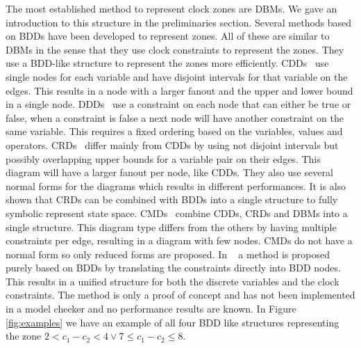 The most established method to represent clock zones are DBMs. We gave an introduction to this structure in the preliminaries section. Several methods based on BDDs have been developed to represent zones. All of these are similar to DBMs in the sense that they use clock constraints to represent the zones. They use a BDD-like structure to represent the zones more efficiently. CDDs~\cite{BRICS19491} use single nodes for each variable and have disjoint intervals for that variable on the edges. This results in a node with a larger fanout and the upper and lower bound in a single node. DDDs~\cite{ddds, ddd-datastructure-99} use a constraint on each node that can either be true or false, when a constraint is false a next node will have another constraint on the same variable. This requires a fixed ordering based on the variables, values and operators. CRDs~\cite{crds} differ mainly from CDDs by using not disjoint intervals but possibly overlapping upper bounds for a variable pair on their edges. This diagram will have a larger fanout per node, like CDDs. They also use several normal forms for the diagrams which results in different performances. It is also shown that CRDs can be combined with BDDs into a single structure to fully symbolic represent state space. CMDs~\cite{5702245} combine CDDs, CRDs and DBMs into a single structure. This diagram type differs from the others by having multiple constraints per edge, resulting in a diagram with few nodes. CMDs do not have a normal form so only reduced forms are proposed. In ~\cite{7098276, 7184781} a method is proposed purely based on BDDs by translating the constraints directly into BDD nodes. This results in a unified structure for both the discrete variables and the clock constraints. The method is only a proof of concept and has not been implemented in a model checker and no performance results are known. In Figure \ref{fig:examples} we have an example of all four BDD like structures representing the zone $2 < c_1 - c_2 < 4 \vee 7 \leq c_1 - c_2 \leq 8$.

